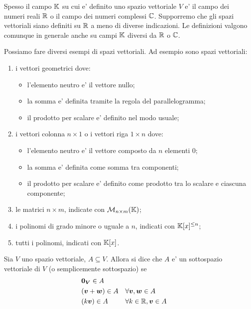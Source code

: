 Spesso il campo $\mathbb{K}$ su cui e' definito uno spazio vettoriale $V$ e' il campo dei numeri reali $\mathbb{R}$ o il campo dei numeri complessi $\mathbb{C}$. Supporremo che gli spazi vettoriali siano definiti su $\mathbb{R}$ a meno di diverse indicazioni. Le definizioni valgono comunque in generale anche su campi $\mathbb{K}$ diversi da $\mathbb{R}$ o $\mathbb{C}$.

\begin{example}
    Possiamo fare diversi esempi di spazi vettoriali. Ad esempio sono spazi vettoriali:
    \begin{enumerate}
        \item i vettori geometrici dove:
        \begin{itemize}
            \item l'elemento neutro e' il vettore nullo;
            \item la somma e' definita tramite la regola del parallelogramma;
            \item il prodotto per scalare e' definito nel modo usuale;
        \end{itemize}
        \item i vettori colonna $n \times 1$ o i vettori riga $1 \times n$ dove:
        \begin{itemize}
            \item l'elemento neutro e' il vettore composto da $n$ elementi $0$;
            \item la somma e' definita come somma tra componenti;
            \item il prodotto per scalare e' definito come prodotto tra lo scalare e ciascuna componente;
        \end{itemize}
        \item le matrici $n \times m$, indicate con $\mathcal{M}_{n \times m}(\mathbb{K})$;
        \item i polinomi di grado minore o uguale a $n$, indicati con $\mathbb{K}[x]^{\leq n}$;
        \item tutti i polinomi, indicati con $\mathbb{K}[x]$.
    \end{enumerate}
\end{example}

\begin{definition}
    Sia $V$ uno spazio vettoriale, $A \subseteq V$. Allora si dice che $A$ e' un sottospazio vettoriale di $V$ (o semplicemente sottospazio) se
    \begin{align}
        &\bm{0_V} \in A \\
        &(\bm{v} + \bm{w}) \in A    &&\forall \bm{v}, \bm{w} \in A \\
        &(k\bm{v}) \in A            &&\forall k \in \mathbb{R}, \bm{v} \in A
    \end{align}
\end{definition}

